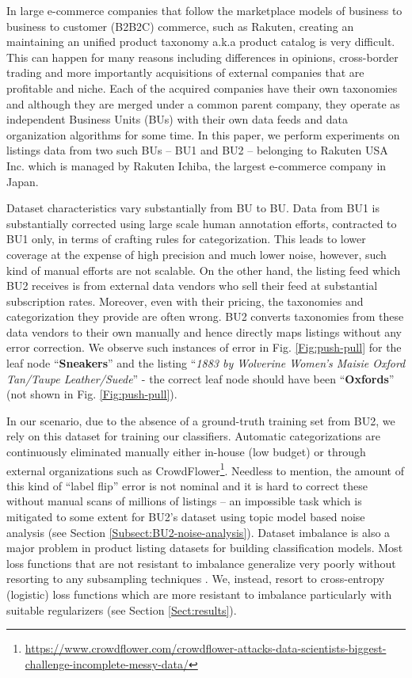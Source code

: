 In large e-commerce companies that follow the marketplace models of business to business to customer (B2B2C) commerce, such as Rakuten, creating an maintaining an unified product taxonomy a.k.a product catalog is very difficult. 
This can happen for many reasons including differences in opinions, cross-border trading and more importantly acquisitions of external companies that are profitable and niche.
Each of the acquired companies have their own taxonomies and although they are merged under a common parent company, they operate as independent Business Units (BUs) with their own data feeds and data organization algorithms for some time.
In this paper, we perform experiments on listings data from two such BUs -- BU1 and BU2 -- belonging to Rakuten USA Inc.
which is managed by Rakuten Ichiba, the largest e-commerce company in Japan.

Dataset characteristics vary substantially from BU to BU.
Data from BU1 is substantially corrected using large scale human annotation efforts, contracted to BU1 only, in terms of crafting rules for categorization.
This leads to lower coverage at the expense of high precision and much lower noise, however, such kind of manual efforts are not scalable.
On the other hand, the listing feed which BU2 receives is from external data vendors who sell their feed at substantial subscription rates. 
Moreover, even with their pricing, the taxonomies and categorization they provide are often wrong.
BU2 converts taxonomies from these data vendors to their own manually and hence directly maps listings without any error correction.
We observe such instances of error in Fig. \ref{Fig:push-pull} for the leaf node ``\textbf{Sneakers}'' and the listing ``\textit{1883 by Wolverine Women's Maisie Oxford Tan/Taupe Leather/Suede}'' - the correct leaf node should have been ``\textbf{Oxfords}'' (not shown in Fig. \ref{Fig:push-pull}).

In our scenario, due to the absence of a ground-truth training set from BU2, we rely on this dataset for training our classifiers. 
Automatic categorizations are continuously eliminated manually either in-house (low budget) or through external organizations such as CrowdFlower\footnote{\scriptsize{\url{https://www.crowdflower.com/crowdflower-attacks-data-scientists-biggest-challenge-incomplete-messy-data/}}}.
Needless to mention, the amount of this kind of ``label flip'' error is not nominal and it is hard to correct these without manual scans of millions of listings -- an impossible task which is mitigated to some extent for BU2's dataset using topic model based noise analysis (see Section \ref{Subsect:BU2-noise-analysis}).
Dataset imbalance is also a major problem in product listing datasets for building classification models.
Most loss functions that are not resistant to imbalance generalize very poorly without resorting to any subsampling techniques \cite{Chawla02:SMOTE}. 
We, instead, resort to cross-entropy (logistic) loss functions which are more resistant to imbalance particularly with suitable regularizers (see Section \ref{Sect:results}). 

